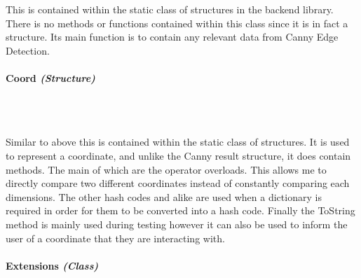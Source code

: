 \begin{FlushLeft}
    This is contained within the static class of structures in the backend library. There is no methods or functions contained within this class since it is in fact a structure. Its main function is to contain any relevant data from Canny Edge Detection.

    \bk
    \pagebreak
    \paragraph{Coord \textit{(Structure)}} \mbox{} \\

    \begin{figure}[H]
        \centering
    \end{figure}\\

    Similar to above this is contained within the static class of structures. It is used to represent a coordinate, and unlike the Canny result structure, it does contain methods. The main of which are the operator overloads. This allows me to directly compare two different coordinates instead of constantly comparing each dimensions. The other hash codes and alike are used when a dictionary is required in order for them to be converted into a hash code. Finally the ToString method is mainly used during testing however it can also be used to inform the user of a coordinate that they are interacting with.

    \bk
    \pagebreak
    \paragraph{Extensions \textit{(Class)}} \mbox{} \\

    \begin{figure}[H]
        \centering
    \end{figure}\\


\end{FlushLeft}
